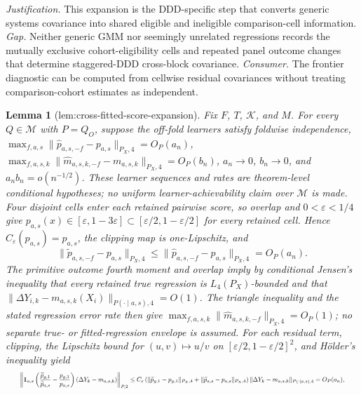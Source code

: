 \documentclass{article}
\newtheorem{lemma}{Lemma}
\begin{document}
\par\smallskip\noindent \textit{Justification.} This expansion is the DDD-specific step that converts generic systems covariance into shared eligible and ineligible comparison-cell information. \textit{Gap.} Neither generic GMM nor seemingly unrelated regressions records the mutually exclusive cohort-eligibility cells and repeated panel outcome changes that determine staggered-DDD cross-block covariance. \textit{Consumer.} The frontier diagnostic can be computed from cellwise residual covariances without treating comparison-cohort estimates as independent.

\begin{lemma}[lem:cross-fitted-score-expansion]\label{lem:cross-fitted-score-expansion}
Fix \(F\), \(T\), \(\mathcal K\), and \(M\). For every \(Q\in\mathcal M\) with \(P=Q_O\), suppose the off-fold learners satisfy foldwise independence, \(\max_{f,a,s}\|\widehat p_{a,s,-f}-p_{a,s}\|_{P_X,4}=O_P(a_n)\), \(\max_{f,a,s,k}\|\widehat m_{a,s,k,-f}-m_{a,s,k}\|_{P_X,4}=O_P(b_n)\), \(a_n\to0\), \(b_n\to0\), and \(a_nb_n=o(n^{-1/2})\). These learner sequences and rates are theorem-level conditional hypotheses; no uniform learner-achievability claim over \(\mathcal M\) is made. Four disjoint cells enter each retained pairwise score, so overlap and \(0<\varepsilon<1/4\) give \(p_{a,s}(x)\in[\varepsilon,1-3\varepsilon]\subset[\varepsilon/2,1-\varepsilon/2]\) for every retained cell. Hence \(C_\varepsilon(p_{a,s})=p_{a,s}\), the clipping map is one-Lipschitz, and \[\|\widetilde p_{a,s,-f}-p_{a,s}\|_{P_X,4}\le\|\widehat p_{a,s,-f}-p_{a,s}\|_{P_X,4}=O_P(a_n).\] The primitive outcome fourth moment and overlap imply by conditional Jensen's inequality that every retained true regression is \(L_4(P_X)\)-bounded and that \(\|\Delta Y_{i,k}-m_{a,s,k}(X_i)\|_{P(\cdot\mid a,s),4}=O(1)\). The triangle inequality and the stated regression error rate then give \(\max_{f,a,s,k}\|\widehat m_{a,s,k,-f}\|_{P_X,4}=O_P(1)\); no separate true- or fitted-regression envelope is assumed. For each residual term, clipping, the Lipschitz bound for \((u,v)\mapsto u/v\) on \([\varepsilon/2,1-\varepsilon/2]^2\), and Hölder's inequality yield \[
\makebox[\linewidth][c]{\resizebox{0.98\linewidth}{!}{\leavevmode\par\noindent \makebox[\linewidth][c]{\resizebox{0.98\linewidth}{!}{\(\displaystyle \displaystyle \left\|\mathbf 1_{a,s}\left(\frac{\widetilde p_{g,1}}{\widetilde p_{a,s}}-\frac{p_{g,1}}{p_{a,s}}\right)(\Delta Y_k-m_{a,s,k})\right\|_{P,2}\le C_\varepsilon\left(\|\widetilde p_{g,1}-p_{g,1}\|_{P_X,4}+\|\widetilde p_{a,s}-p_{a,s}\|_{P_X,4}\right)\|\Delta Y_k-m_{a,s,k}\|_{P(\cdot\mid a,s),4}=O_P(a_n),\)}}\par\noindent}}
\]
\end{lemma}
\end{document}
